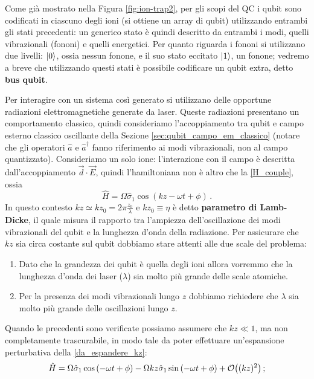 \noindent Come già mostrato nella Figura \ref{fig:ion-trap2}, per gli scopi del QC i qubit sono codificati in ciascuno degli ioni (si ottiene un array di qubit) utilizzando entrambi gli stati precedenti: un generico stato è quindi descritto da entrambi i modi, quelli vibrazionali (fononi) e quelli energetici. Per quanto riguarda i fononi si utilizzano due livelli: $\ket{0}$, ossia nessun fonone, e il suo stato eccitato $\ket{1}$, un fonone; vedremo a breve che utilizzando questi stati è possibile codificare un qubit extra, detto \textbf{bus qubit}. 

\noindent Per interagire con un sistema così generato si utilizzano delle opportune radiazioni elettromagnetiche generate da laser. Queste radiazioni presentano un comportamento classico, quindi consideriamo l'accoppiamento tra qubit e campo esterno classico oscillante della Sezione \ref{sec:qubit_campo_em_classico} (notare che gli operatori $\hat{a}$ e $\hat{a}^\dag$ fanno riferimento ai modi vibrazionali, non al campo quantizzato). Consideriamo un solo ione: l'interazione con il campo è descritta dall'accoppiamento $\vec{d} \cdot \vec{E}$, quindi l'hamiltoniana non è altro che la \eqref{H_couple}, ossia
\begin{equation}\label{da_espandere_kz}
    \hat{H} = \Omega \hat{\sigma}_1 \cos \left( k z - \omega t + \phi \right) \, .
\end{equation}
In questo contesto $kz \simeq k z_0 = 2\pi \frac{z_0}{\lambda}$ e $k z_0 \equiv \eta$ è detto \textbf{parametro di Lamb-Dicke}, il quale misura il rapporto tra l'ampiezza dell'oscillazione dei modi vibrazionali del qubit e la lunghezza d'onda della radiazione. Per assicurare che $kz$ sia circa costante sul qubit dobbiamo stare attenti alle due scale del problema:
\begin{enumerate}
    \item Dato che la grandezza dei qubit è quella degli ioni allora vorremmo che la lunghezza d'onda dei laser ($\lambda$) sia molto più grande delle scale atomiche. 
    
    \item Per la presenza dei modi vibrazionali lungo $z$ dobbiamo richiedere che $\lambda$ sia molto più grande delle oscillazioni lungo $z$. 
\end{enumerate}
\noindent Quando le precedenti sono verificate possiamo assumere che $kz \ll 1$, ma non completamente trascurabile, in modo tale da poter effettuare un'espansione perturbativa della \eqref{da_espandere_kz}:
\begin{equation*}
    \hat{H} = \Omega \hat{\sigma}_1 \cos \left( -\omega t + \phi \right) - \Omega k z \hat{\sigma}_1 \sin \left( -\omega t + \phi \right) + \order{(kz)^2} \, ;
\end{equation*}
